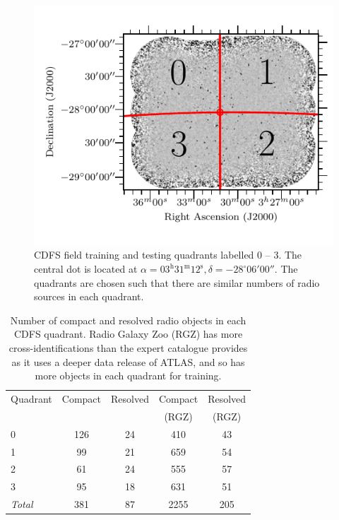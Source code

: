     \begin{figure}
      \centering
      \includegraphics[width=0.6\columnwidth, trim={0cm 0.5cm 0cm 0.5cm}, clip]{atlas-images/quadrants.pdf}
      \caption[CDFS field training and testing quadrants.]{CDFS field training and testing quadrants labelled 0 -- 3. The
        central dot is located at $\alpha = 03^\text{h}31^\text{m}12^\text{s},
        \delta = -28^\circ{}06'00''$. The quadrants are chosen such that
        there are similar numbers of radio sources in each
        quadrant.\label{fig:quadrants}}
    \end{figure}

    \begin{table}
      \caption[Number of compact and resolved radio objects in each CDFS
      quadrant.]{Number of compact and resolved radio objects in each CDFS
      quadrant. Radio Galaxy Zoo (RGZ) has more cross-identifications than the
      expert catalogue \citep{norris06} provides as it uses a deeper data release of ATLAS, and
      so has more objects in each quadrant for training.}
      \label{tab:radio-count}
      \centering
      \begin{tabular}{lcccc}
        \hline\hline
        Quadrant & Compact & Resolved & Compact & Resolved\\
        &&&(RGZ)&(RGZ)\\
        \hline
        0 & 126 & 24 & 410 & 43 \\
        1 & 99 & 21 & 659 & 54 \\
        2 & 61 & 24 & 555 & 57 \\
        3 & 95 & 18 & 631 & 51 \\
        \hline
        \textit{Total} & 381 & 87 & 2255 & 205\\
        \hline\hline
      \end{tabular}
    \end{table}

